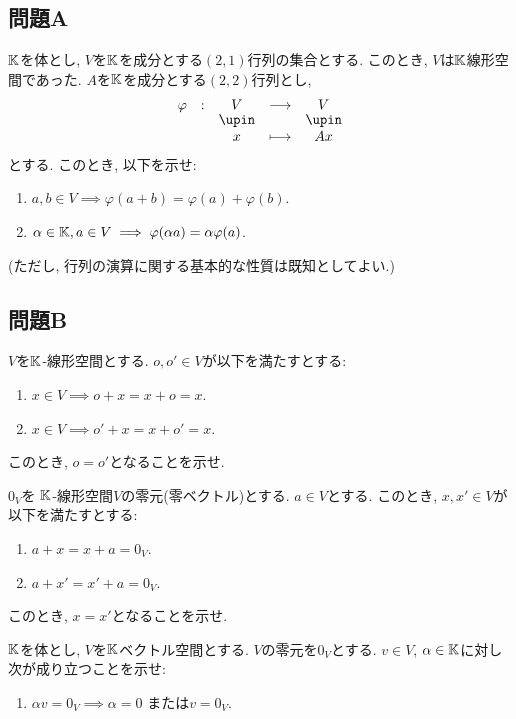 \subsection{問題A}
\begin{quiz}
  $\mathbb{K}$を体とし, $V$を$\mathbb{K}$を成分とする$(2,1)$行列の集合とする.
  このとき, $V$は$\mathbb{K}$線形空間であった.
  $A$を$\mathbb{K}$を成分とする$(2,2)$行列とし,
  \begin{align*}
    \shazo{\varphi}{V}{V}{x}{Ax}
  \end{align*}
  とする.
  このとき, 以下を示せ:
  \begin{enumerate}
    \item $a,b\in V\implies \varphi(a+b)=\varphi(a)+\varphi(b)$.
    \item $\alpha\in\mathbb{K}, a\in V\implies \varphi(\alpha a)=\alpha\varphi(a)$.
  \end{enumerate}
  (ただし, 行列の演算に関する基本的な性質は既知としてよい.)
\end{quiz}

\subsection{問題B}

\begin{quiz}
  $V$を$\mathbb{K}$-線形空間とする.
  $o,o'\in V$が以下を満たすとする:
  \begin{enumerate}
    \item $x\in V \implies  o+x=x+o=x$.
    \item $x\in V \implies  o'+x=x+o'=x$.
  \end{enumerate}
  このとき, $o=o'$となることを示せ.
\end{quiz}

\begin{quiz}
  $0_V$を
  $\mathbb{K}$-線形空間$V$の零元(零ベクトル)とする.
  $a\in V$とする.
  このとき, $x,x'\in V$が以下を満たすとする:
  \begin{enumerate}
    \item $a+x=x+a=0_V$.
    \item $a+x'=x'+a=0_V$.
  \end{enumerate}
  このとき, $x=x'$となることを示せ.
\end{quiz}

\begin{quiz}
  $\mathbb{K}$を体とし,
  $V$を$\mathbb{K}$ベクトル空間とする.
  $V$の零元を$0_V$とする.
  $v\in V$, $\alpha\in \mathbb{K}$に対し次が成り立つことを示せ:
  \begin{enumerate}
    \item $\alpha v=0_V\implies \alpha=0$ または$v=0_V$.
  \end{enumerate}
\end{quiz}

